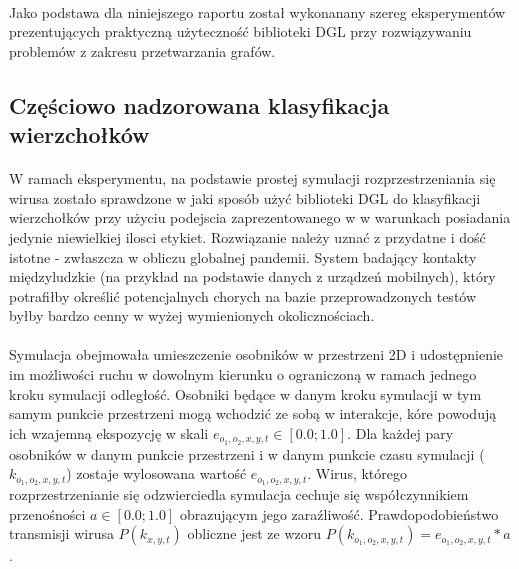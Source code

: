\documentclass{article}
\begin{document}
\paragraph{}
Jako podstawa dla niniejszego raportu został wykonanany szereg eksperymentów prezentujących praktyczną użyteczność biblioteki DGL \cite{dgl} przy rozwiązywaniu problemów z zakresu przetwarzania grafów.

\subsection{Częściowo nadzorowana klasyfikacja wierzchołków}
\paragraph{}
W ramach eksperymentu, na podstawie prostej symulacji rozprzestrzeniania się wirusa zostało sprawdzone w jaki sposób użyć biblioteki DGL \cite{dgl} do klasyfikacji wierzchołków przy użyciu podejscia zaprezentowanego w \cite{gcn} w warunkach posiadania jedynie niewielkiej ilosci etykiet. Rozwiązanie należy uznać z przydatne i dość istotne - zwłaszcza w obliczu globalnej pandemii. System badający kontakty międzyludzkie (na przykład na podstawie danych z urządzeń mobilnych), który potrafiłby określić potencjalnych chorych na bazie przeprowadzonych testów byłby bardzo cenny w wyżej wymienionych okolicznościach.

\paragraph{}
Symulacja obejmowała umieszczenie osobników w przestrzeni 2D i udostępnienie im możliwości ruchu w dowolnym kierunku o ograniczoną w ramach jednego kroku symulacji odległość. Osobniki będące w danym kroku symulacji w tym samym punkcie przestrzeni mogą wchodzić ze sobą w interakcje, kóre powodują ich wzajemną ekspozycję w skali $e_{o_1, o_2, x, y, t} \in [0.0; 1.0]$. Dla każdej pary osobników w danym punkcie przestrzeni i w danym punkcie czasu symulacji ($k_{o_1, o_2, x, y, t}$) zostaje wylosowana wartość $e_{o_1, o_2, x, y, t}$. Wirus, którego rozprzestrzenianie się odzwierciedla symulacja cechuje się współczynnikiem przenośności $a \in [0.0; 1.0]$ obrazującym jego zaraźliwość. Prawdopodobieństwo transmisji wirusa $P(k_{x, y, t})$ obliczne jest ze wzoru $P(k_{o_1, o_2, x, y, t}) = e_{o_1, o_2, x, y, t} * a$.
\end{document}
